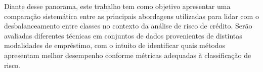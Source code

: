 Diante desse panorama, este trabalho tem como objetivo apresentar uma comparação sistemática entre as principais abordagens utilizadas para lidar com o desbalanceamento entre classes no contexto da análise de risco de crédito. Serão avaliadas diferentes técnicas em conjuntos de dados provenientes de distintas modalidades de empréstimo, com o intuito de identificar quais métodos apresentam melhor desempenho conforme métricas adequadas à classificação de risco.

